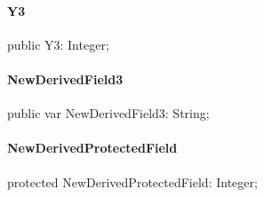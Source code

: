 \documentclass{report}
\begin{document}
\paragraph*{Y3}\hspace*{\fill}

\begin{list}{}{
\setlength{\itemindent}{0cm}
\setlength{\listparindent}{0cm}
\setlength{\leftmargin}{\evensidemargin}
\addtolength{\leftmargin}{\tmplength}
\settowidth{\labelsep}{X}
\addtolength{\leftmargin}{\labelsep}
\setlength{\labelwidth}{\tmplength}
}
\begin{flushleft}
\item[\textbf{Declaration}\hfill]
\begin{ttfamily}
public Y3: Integer;\end{ttfamily}


\end{flushleft}
\end{list}
\paragraph*{NewDerivedField3}\hspace*{\fill}

\begin{list}{}{
\setlength{\itemindent}{0cm}
\setlength{\listparindent}{0cm}
\setlength{\leftmargin}{\evensidemargin}
\addtolength{\leftmargin}{\tmplength}
\settowidth{\labelsep}{X}
\addtolength{\leftmargin}{\labelsep}
\setlength{\labelwidth}{\tmplength}
}
\begin{flushleft}
\item[\textbf{Declaration}\hfill]
\begin{ttfamily}
public var NewDerivedField3: String;\end{ttfamily}


\end{flushleft}
\end{list}
\paragraph*{NewDerivedProtectedField}\hspace*{\fill}

\begin{list}{}{
\setlength{\itemindent}{0cm}
\setlength{\listparindent}{0cm}
\setlength{\leftmargin}{\evensidemargin}
\addtolength{\leftmargin}{\tmplength}
\settowidth{\labelsep}{X}
\addtolength{\leftmargin}{\labelsep}
\setlength{\labelwidth}{\tmplength}
}
\begin{flushleft}
\item[\textbf{Declaration}\hfill]
\begin{ttfamily}
protected NewDerivedProtectedField: Integer;\end{ttfamily}


\end{flushleft}
\end{list}
\end{document}
